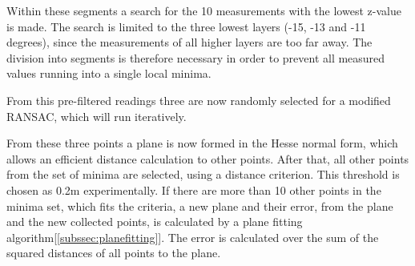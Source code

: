 \documentclass[11pt,oneside,openright]{mpreport}
\begin{document}



Within these segments a search for the 10 measurements with the lowest z-value is made. The search is limited to the three lowest layers (-15, -13 and -11 degrees),
since the measurements of all higher layers are too far away. The division into segments is therefore necessary in order to prevent all measured values running into a single local minima. 


From this pre-filtered readings three are now randomly selected for a modified \ac{RANSAC}, which will run iteratively.

From these three points a plane is now formed in the Hesse normal form, which allows an efficient distance calculation to other points.
After that, all other points from the set of minima are selected, using a distance criterion. This threshold is chosen as 0.2m experimentally.
If there are more than 10 other points in the minima set, which fits the criteria, a new plane and their error, from the plane and
the new collected points, is calculated by a plane fitting algorithm[\cref{subssec:planefitting}].
The error is calculated over the sum of the squared distances of all points to the plane.
\end{document}

